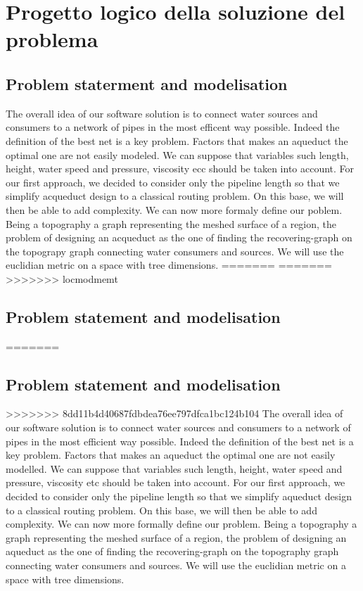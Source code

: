 \chapter{Progetto logico della soluzione del problema}
\label{capitolo4}
\thispagestyle{empty}


\section{Problem staterment and modelisation}
The overall idea of our software solution is to connect water sources and consumers to a network of 
pipes in the most efficent way possible. Indeed the definition of the best net is a key problem. 
Factors that makes an aqueduct the optimal one are not easily modeled. We can suppose that variables 
such length, height, water speed and pressure, viscosity ecc should be taken into account.
\hfill For our first approach, we decided to consider only the pipeline length so that we simplify 
acqueduct design to a classical routing problem. On this base, we will then be able to add complexity.
\hfill We can now more formaly define our poblem. Being a topography a graph representing the meshed 
surface of a region, the problem of designing an acqueduct as the one of finding the recovering-graph 
on the topograpy graph connecting water consumers and sources. We will use the euclidian metric on a 
space with tree dimensions.
=======
=======
>>>>>>> locmodmemt
\section {Problem statement and modelisation}
=======
\section{Problem statement and modelisation}
>>>>>>> 8dd11b4d40687fdbdea76ee797dfca1bc124b104
The overall idea of our software solution is to connect water sources and consumers to a network of pipes in the most efficient way possible. Indeed the definition of the best net is a key problem. Factors that makes an aqueduct the optimal one are not easily modelled. We can suppose that variables such length, height, water speed and pressure, viscosity etc should be taken into account.
\hfill For our first approach, we decided to consider only the pipeline length so that we simplify aqueduct design to a classical routing problem. On this base, we will then be able to add complexity.
\hfill We can now more formally define our problem. Being a topography a graph representing the meshed surface of a region, the problem of designing an aqueduct as the one of finding the recovering-graph on the topography graph connecting water consumers and sources. We will use the euclidian metric on a space with tree dimensions.

